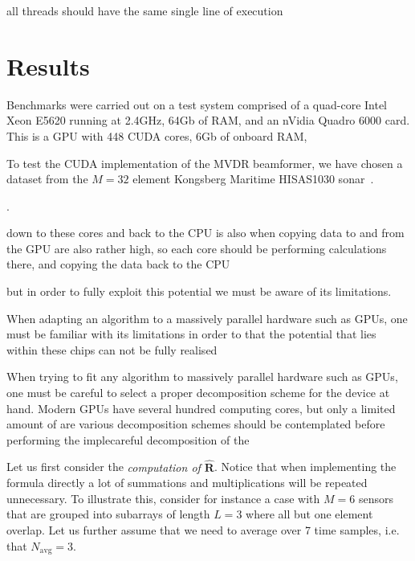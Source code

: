 \documentclass[10pt,a4paper]{article}
\newcounter{todoidx}
\newlength\marginparwidthsmall
\newcommand\todo[1]{%
      \addtocounter{todoidx}{1}%
      {\color{Red}\fbox{\bf\thetodoidx{}}}%
      \marginpar{%
         {\vspace*{-10pt}\color{Red}\fbox{\bf\thetodoidx{}}}\\%
         \fcolorbox{red}{todobackground}{\parbox{\marginparwidthsmall}{\scriptsize #1}}}}
\newcommand\todo[1]{}
\newcommand\mat[1]{\boldsymbol{#1}}
\newcommand\1{\vec 1}
\begin{document}
all threads should have the same single line of execution


\section{Results}

Benchmarks were carried out on a test system comprised of a quad-core Intel Xeon E5620 running at 2.4GHz, 64Gb of \gls{RAM}, and an nVidia Quadro 6000 card. This is a \gls{GPU} with 448 \gls{CUDA} cores, 6Gb of onboard \gls{RAM}, 

To test the \gls{CUDA} implementation of the \gls{MVDR} beamformer, we have chosen a dataset from the $M=32$ element Kongsberg Maritime HISAS1030 sonar~\cite{Hansen2009}. \todo{Data???}.





down to these cores and back to the \gls{CPU} is also when copying data to and from the \gls{GPU} are also rather high, so each core should be   performing calculations there, and copying the data back to the \gls{CPU}

 but in order to fully exploit this potential we must be aware of its limitations.  

When adapting an algorithm to a massively parallel hardware such as \glspl{GPU}, one must be familiar with its limitations in order to that the potential that lies within these chips can not be fully realised 

When trying to fit any algorithm to massively parallel hardware such as \glspl{GPU}, one must be careful to select a proper decomposition scheme for the device at hand. Modern \glspl{GPU} have several hundred computing cores, but only a limited amount of  are  various decomposition schemes should be contemplated before performing the implecareful decomposition of the 


Let us first consider the \emph{computation of $\hat{\mat R}$}. Notice that when implementing the formula directly a lot of summations and multiplications will be repeated unnecessary. To illustrate this, consider for instance a case with $M=6$ sensors that are grouped into subarrays of length $L=3$ where all but one element overlap. Let us further assume that we need to average over 7 time samples, i.e. that $N_{\text{avg}} = 3$. 
\end{document}
